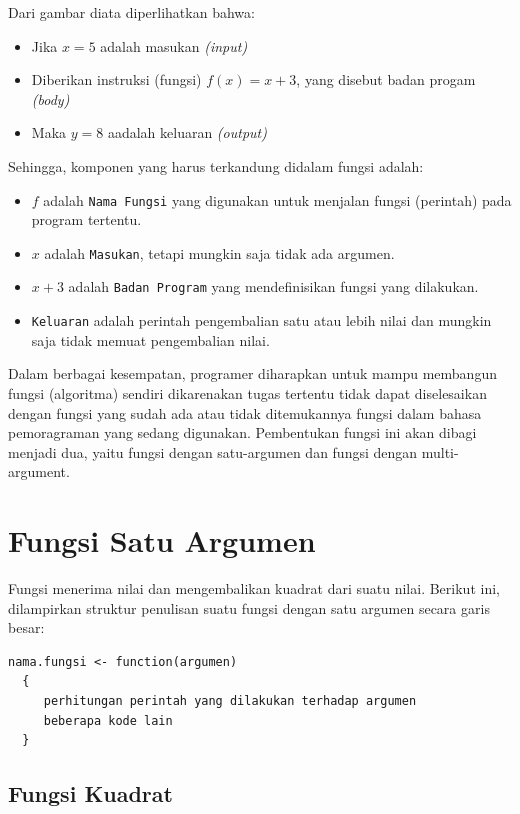 \documentclass[
]{book}
\providecommand{\tightlist}{%
  \setlength{\itemsep}{0pt}\setlength{\parskip}{0pt}}
\begin{document}
Dari gambar diata diperlihatkan bahwa:

\begin{itemize}
\tightlist
\item
  Jika \(x=5\) adalah masukan \emph{(input)}
\item
  Diberikan instruksi (fungsi) \(f(x)=x+3\), yang disebut badan progam \emph{(body)}
\item
  Maka \(y=8\) aadalah keluaran \emph{(output)}
\end{itemize}

Sehingga, komponen yang harus terkandung didalam fungsi adalah:

\begin{itemize}
\tightlist
\item
  \(f\) adalah \texttt{Nama\ Fungsi} yang digunakan untuk menjalan fungsi (perintah) pada program tertentu.
\item
  \(x\) adalah \texttt{Masukan}, tetapi mungkin saja tidak ada argumen.
\item
  \(x+3\) adalah \texttt{Badan\ Program} yang mendefinisikan fungsi yang dilakukan.
\item
  \texttt{Keluaran} adalah perintah pengembalian satu atau lebih nilai dan mungkin saja tidak memuat pengembalian nilai.
\end{itemize}

Dalam berbagai kesempatan, programer diharapkan untuk mampu membangun fungsi (algoritma) sendiri dikarenakan tugas tertentu tidak dapat diselesaikan dengan fungsi yang sudah ada atau tidak ditemukannya fungsi dalam bahasa pemoragraman yang sedang digunakan. Pembentukan fungsi ini akan dibagi menjadi dua, yaitu fungsi dengan satu-argumen dan fungsi dengan multi-argument.

\hypertarget{fungsi-satu-argumen}{%
\section{Fungsi Satu Argumen}\label{fungsi-satu-argumen}}

Fungsi menerima nilai dan mengembalikan kuadrat dari suatu nilai. Berikut ini, dilampirkan struktur penulisan suatu fungsi dengan satu argumen secara garis besar:

\begin{verbatim}
nama.fungsi <- function(argumen)
  {
     perhitungan perintah yang dilakukan terhadap argumen
     beberapa kode lain
  } 
\end{verbatim}

\hypertarget{fungsi-kuadrat}{%
\subsection{Fungsi Kuadrat}\label{fungsi-kuadrat}}
\end{document}
